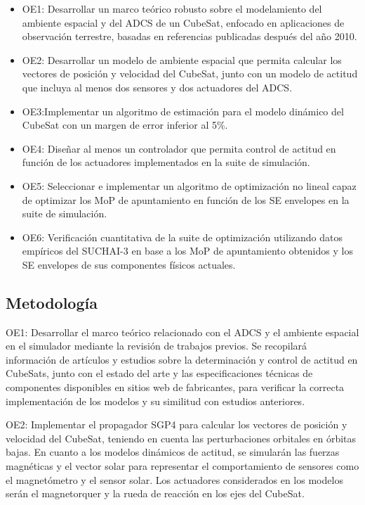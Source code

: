 \begin{itemize}
	\item OE1: Desarrollar un marco teórico robusto sobre el modelamiento del ambiente espacial y del \gls{ADCS} de un CubeSat, enfocado en aplicaciones de observación terrestre, basadas en referencias publicadas después del año 2010.
	\item OE2: Desarrollar un modelo de ambiente espacial que permita calcular los vectores de posición y velocidad del CubeSat, junto con un modelo de actitud que incluya al menos dos sensores y dos actuadores del \gls{ADCS}.
	\item OE3:Implementar un algoritmo de estimación para el modelo dinámico del CubeSat con un margen de error inferior al 5\%.
	\item OE4: Diseñar al menos un  controlador que permita control de actitud en función de los actuadores implementados en la suite de simulación.
	\item OE5: Seleccionar e implementar un algoritmo de optimización no lineal capaz de optimizar los MoP de apuntamiento en función de los SE envelopes en la suite de simulación.
	\item OE6: Verificación cuantitativa de la suite de optimización utilizando datos empíricos del SUCHAI-3 en base a los MoP de apuntamiento obtenidos y los SE envelopes de sus componentes físicos actuales.
\end{itemize}




\subsection{Metodología}

OE1: Desarrollar el marco teórico relacionado con el \gls{ADCS} y el ambiente espacial en el simulador mediante la revisión de trabajos previos. Se recopilará información de artículos y estudios sobre la determinación y control de actitud en CubeSats, junto con el estado del arte y las especificaciones técnicas de componentes disponibles en sitios web de fabricantes, para verificar la correcta implementación de los modelos y su similitud con estudios anteriores.

OE2: Implementar el propagador SGP4 para calcular los vectores de posición y velocidad del CubeSat, teniendo en cuenta las perturbaciones orbitales en órbitas bajas. En cuanto a los modelos dinámicos de actitud, se simularán las fuerzas magnéticas y el vector solar para representar el comportamiento de sensores como el magnetómetro y el sensor solar. Los actuadores considerados en los modelos serán el magnetorquer y la rueda de reacción en los ejes del CubeSat.

